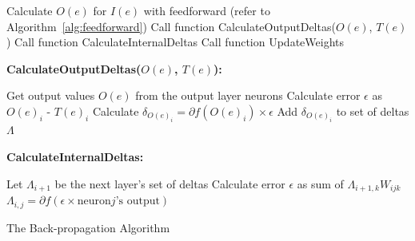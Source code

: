 \documentclass[11pt]{article}
\begin{document}
\begin{algorithm}%
\SetLine
{}
{
	Calculate $O(e)$ for $I(e)$ with feedforward (refer to Algorithm~\ref{alg:feedforward})\;
	Call function CalculateOutputDeltas($O(e)$, $T(e)$)\;
	Call function CalculateInternalDeltas\;
	Call function UpdateWeights\;
}

\textbf{CalculateOutputDeltas($O(e)$, $T(e)$):}

Get output values $O(e)$ from the output layer neurons\;
{
	Calculate error $\epsilon$ as $O(e)_i$ - $T(e)_i$\;
	Calculate \textbf{$\delta_{O(e)_{i}} = \partial{f(O(e)_{i})}  \times \epsilon $}\;
	Add $\delta_{O(e)_{i}}$ to set of deltas $\Lambda$
}  

\textbf{CalculateInternalDeltas:}

Let $\Lambda_{i+1}$ be the next layer's set of deltas\;
{
	{
		{
			Calculate error $\epsilon$ as sum of $\Lambda_{i+1,k} W_{ijk}$\;
		}
		$\Lambda_{i,j} = \partial{f( \epsilon \times \mbox{neuron} j\mbox{'s output} )}$\;
	}
} 





\caption{The Back-propagation Algorithm }
\label{alg:feedforward}
\end{algorithm}
\end{document}

